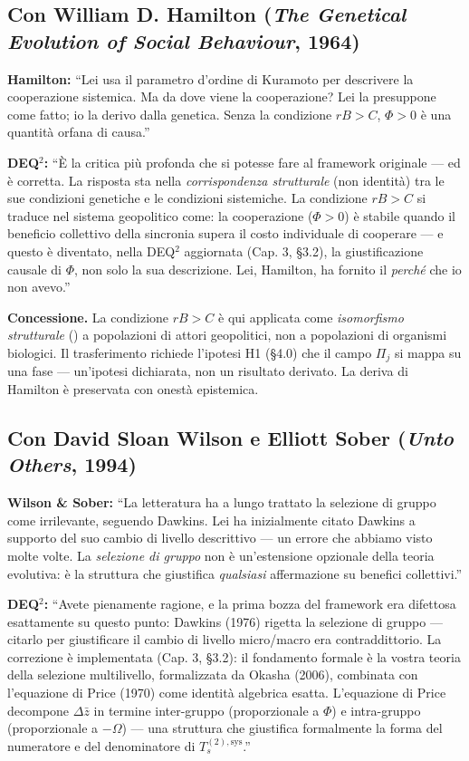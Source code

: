 \subsection{Con William D. Hamilton (\emph{The Genetical Evolution of
Social Behaviour}, 1964)}\label{con-hamilton-1964}

\textbf{Hamilton:} ``Lei usa il parametro d'ordine di Kuramoto per
descrivere la cooperazione sistemica. Ma da dove viene la cooperazione?
Lei la presuppone come fatto; io la derivo dalla genetica. Senza la
condizione $rB > C$, $\Phi > 0$ è una quantità orfana di causa.''

\textbf{DEQ$^2$:} ``È la critica più profonda che si potesse fare al
framework originale --- ed è corretta. La risposta sta nella
\emph{corrispondenza strutturale} (non identità) tra le sue condizioni
genetiche e le condizioni sistemiche. La condizione $rB > C$ si traduce
nel sistema geopolitico come: la cooperazione ($\Phi > 0$) è stabile
quando il beneficio collettivo della sincronia supera il costo
individuale di cooperare --- e questo è diventato, nella DEQ$^2$
aggiornata (Cap. 3, §3.2), la giustificazione causale di $\Phi$, non solo
la sua descrizione. Lei, Hamilton, ha fornito il \emph{perché} che io
non avevo.''

\textbf{Concessione.} La condizione $rB > C$ è qui applicata come
\emph{isomorfismo strutturale} (\Hypoth{}) a popolazioni di attori
geopolitici, non a popolazioni di organismi biologici. Il trasferimento
richiede l'ipotesi H1 (§4.0) che il campo $\Pi_j$ si mappa su una fase
--- un'ipotesi dichiarata, non un risultato derivato. La deriva di
Hamilton è preservata con onestà epistemica.

\subsection{Con David Sloan Wilson e Elliott Sober (\emph{Unto Others},
1994)}\label{con-wilson-sober-1994}

\textbf{Wilson \& Sober:} ``La letteratura ha a lungo trattato la
selezione di gruppo come irrilevante, seguendo Dawkins. Lei ha inizialmente
citato Dawkins a supporto del suo cambio di livello descrittivo --- un
errore che abbiamo visto molte volte. La \emph{selezione di gruppo} non
è un'estensione opzionale della teoria evolutiva: è la struttura che
giustifica \emph{qualsiasi} affermazione su benefici collettivi.''

\textbf{DEQ$^2$:} ``Avete pienamente ragione, e la prima bozza del
framework era difettosa esattamente su questo punto: Dawkins (1976)
rigetta la selezione di gruppo --- citarlo per giustificare il cambio di
livello micro/macro era contraddittorio. La correzione è implementata
(Cap. 3, §3.2): il fondamento formale è la vostra teoria della selezione
multilivello, formalizzata da Okasha (2006), combinata con l'equazione di
Price (1970) come identità algebrica esatta. L'equazione di Price
decompone $\Delta\bar{z}$ in termine inter-gruppo (proporzionale a $\Phi$)
e intra-gruppo (proporzionale a $-\Omega$) --- una struttura che giustifica
formalmente la forma del numeratore e del denominatore di
$T_s^{(2),\text{sys}}$.''

